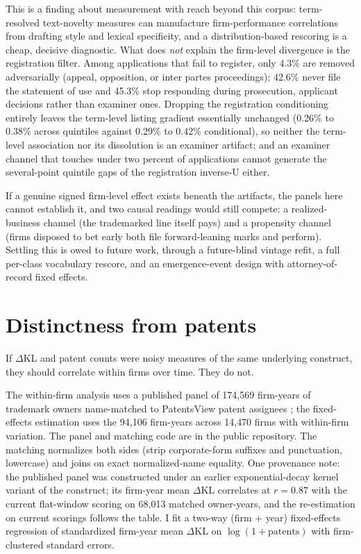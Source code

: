 \documentclass[11pt]{article}
\newcommand{\dkl}{$\Delta$KL}
\begin{document}
This is a finding about measurement with reach beyond this corpus:
term-resolved text-novelty measures can manufacture firm-performance
correlations from drafting style and lexical specificity, and a
distribution-based rescoring is a cheap, decisive diagnostic. What does \emph{not} explain the firm-level
divergence is the registration filter. Among applications that fail to
register, only 4.3\% are removed adversarially (appeal, opposition, or
inter partes proceedings); 42.6\% never file the statement of use and
45.3\% stop responding during prosecution, applicant decisions rather
than examiner ones. Dropping the registration conditioning entirely
leaves the term-level listing gradient essentially unchanged (0.26\% to
0.38\% across quintiles against 0.29\% to 0.42\% conditional), so neither
the term-level association nor its dissolution is an examiner artifact;
and an examiner channel that touches under two percent of applications
cannot generate the several-point quintile gaps of the registration
inverse-U either.

If a genuine signed firm-level effect exists beneath the artifacts, the
panels here cannot establish it, and two causal readings would still
compete: a realized-business channel (the trademarked line itself pays)
and a propensity channel (firms disposed to bet early both file
forward-leaning marks and perform). Settling this is owed to future work,
through a future-blind vintage refit, a full per-class vocabulary rescore,
and an emergence-event design with attorney-of-record fixed effects.

\section{Distinctness from patents}\label{sec:patent}

If \dkl{} and patent counts were noisy measures of the same underlying
construct, they should correlate within firms over time. They do not.

The within-firm analysis uses a published panel of 174{,}569 firm-years of
trademark owners name-matched to PatentsView patent assignees
\citep{PatentsView}; the fixed-effects estimation uses the 94{,}106
firm-years across 14{,}470 firms with within-firm variation. The panel and
matching code are in the public repository. The matching normalizes both sides (strip corporate-form
suffixes and punctuation, lowercase) and joins on exact normalized-name
equality. One provenance note: the published panel was constructed under
an earlier exponential-decay kernel variant of the construct; its
firm-year mean \dkl{} correlates at $r = 0.87$ with the current
flat-window scoring on 68{,}013 matched owner-years, and the
re-estimation on current scorings follows the table. I fit a two-way
(firm + year) fixed-effects regression of standardized firm-year mean
\dkl{} on $\log(1 + \mathrm{patents})$ with firm-clustered standard
errors.
\end{document}
